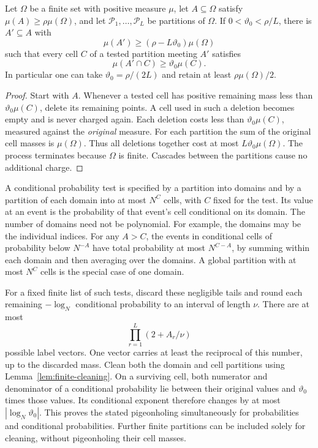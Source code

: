 \begin{lemma}\label{lem:finite-cleaning}
Let $\Omega$ be a finite set with positive measure $\mu$, let
$A\subseteq\Omega$ satisfy $\mu(A)\ge\rho\mu(\Omega)$, and let
$\mathcal P_1,\ldots,\mathcal P_L$ be partitions of $\Omega$.
If $0<\vartheta_0<\rho/L$, there is $A'\subseteq A$ with
\[
 \mu(A')\ge(\rho-L\vartheta_0)\mu(\Omega)
\]
such that every cell $C$ of a tested partition meeting $A'$ satisfies
\[
 \mu(A'\cap C)\ge\vartheta_0\mu(C).
\]
In particular one can take $\vartheta_0=\rho/(2L)$ and retain at least
$\rho\mu(\Omega)/2$.
\end{lemma}

\begin{proof}
Start with $A$.  Whenever a tested cell has positive remaining mass less
than $\vartheta_0\mu(C)$, delete its remaining points.  A cell used in such
a deletion becomes empty and is never charged again.  Each deletion costs
less than $\vartheta_0\mu(C)$, measured against the \emph{original} measure.
For each partition the sum of the original cell masses is $\mu(\Omega)$.
Thus all deletions together cost at most $L\vartheta_0\mu(\Omega)$.
The process terminates because $\Omega$ is finite.  Cascades between the
partitions cause no additional charge.
\end{proof}

A conditional probability test is specified by a partition into domains and
by a partition of each domain into at most $N^C$ cells, with $C$ fixed for
the test.  Its value at an event is the probability of that event's cell
conditional on its domain.  The number of domains need not be polynomial.
For example, the domains may be the individual indices.  For any $A>C$,
the events in conditional cells of probability below $N^{-A}$ have total
probability at most $N^{C-A}$, by summing within each domain and then
averaging over the domains.  A global partition with at most $N^C$ cells is
the special case of one domain.

For a fixed finite list of such tests, discard these negligible tails and
round each remaining $-\log_N$ conditional probability to an interval of
length $\nu$.  There are at most
\[
 \prod_{r=1}^L(2+A_r/\nu)
\]
possible label vectors.  One vector carries at least the reciprocal of this
number, up to the discarded mass.  Clean both the domain and cell partitions
using Lemma~\ref{lem:finite-cleaning}.  On a surviving cell, both numerator
and denominator of a conditional probability lie between their original
values and $\vartheta_0$ times those values.  Its conditional exponent
therefore changes by at most $|\log_N\vartheta_0|$.  This proves the stated
pigeonholing simultaneously for probabilities and conditional
probabilities.  Further finite partitions can be included solely for
cleaning, without pigeonholing their cell masses.

